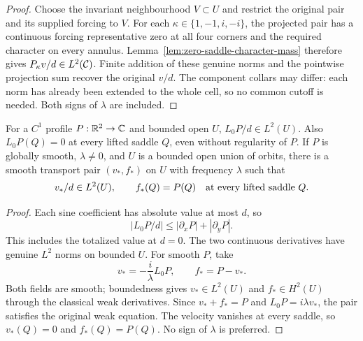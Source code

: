 \begin{proof}
\leanok
Choose the invariant neighbourhood $V\subset U$ and restrict the original
pair and its supplied forcing to $V$.
For each $\kappa\in\{1,-1,i,-i\}$, the projected pair has a continuous
forcing representative zero at all four corners and the required character
on every annulus. Lemma~\ref{lem:zero-saddle-character-mass} therefore gives
$P_\kappa v/d\in L^2(\mathcal{C})$.
Finite addition of these genuine norms and the pointwise projection sum
recover the original $v/d$. The component collars may differ: each norm has
already been extended to the whole cell, so no common cutoff is needed.
Both signs of $\lambda$ are included.
\end{proof}

\begin{lemma}
\label{lem:smooth-transport-pair}
\leanok
For a $C^1$ profile $P:\mathbb{R}^2\to\mathbb{C}$ and bounded open $U$,
$L_0P/d\in L^2(U)$. Also $L_0P(Q)=0$ at every lifted saddle $Q$,
even without regularity of $P$.
If $P$ is globally smooth, $\lambda\ne0$, and $U$ is a bounded open
union of orbits, there is a smooth transport pair $(v_*,f_*)$ on $U$
with frequency $\lambda$ such that
\[
 v_*/d\in L^2(U),\qquad f_*(Q)=P(Q)
 \quad\hbox{at every lifted saddle }Q.
\]
\end{lemma}

\begin{proof}
\leanok
Each sine coefficient has absolute value at most $d$, so
\[
 |L_0P/d|\le |\partial_xP|+|\partial_yP|.
\]
This includes the totalized value at $d=0$.
The two continuous derivatives have genuine $L^2$ norms on bounded $U$.
For smooth $P$, take
\[
 v_*=-\frac{i}{\lambda}L_0P,\qquad f_*=P-v_*.
\]
Both fields are smooth; boundedness gives $v_*\in L^2(U)$ and
$f_*\in H^2(U)$ through the classical weak derivatives.
Since $v_*+f_*=P$ and $L_0P=i\lambda v_*$, the pair satisfies the
original weak equation. The velocity vanishes at every saddle, so
$v_*(Q)=0$ and $f_*(Q)=P(Q)$. No sign of $\lambda$ is preferred.
\end{proof}

